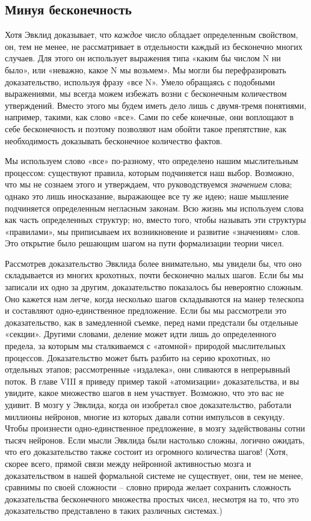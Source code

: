 \documentclass[../main.tex]{subfiles}
\begin{document}
\subsection{Минуя бесконечность}

Хотя Эвклид доказывает, что \emph{каждое} число обладает определенным свойством, он, тем не менее, не рассматривает в отдельности каждый из бесконечно многих случаев. Для этого он использует выражения типа «каким бы числом N ни было», или «неважно, какое N мы возьмем». Мы могли бы перефразировать доказательство, используя фразу «все N». Умело обращаясь с подобными выражениями, мы всегда можем избежать возни с бесконечным количеством утверждений. Вместо этого мы будем иметь дело лишь с двумя-тремя понятиями, например, такими, как слово «все». Сами по себе конечные, они воплощают в себе бесконечность и поэтому позволяют нам обойти такое препятствие, как необходимость доказывать бесконечное количество фактов.

Мы используем слово «все» по-разному, что определено нашим мыслительным процессом: существуют правила, которым подчиняется наш выбор. Возможно, что мы не сознаем этого и утверждаем, что руководствуемся \emph{значением} слова; однако это лишь иносказание, выражающее все ту же идею; наше мышление подчиняется определенным негласным законам. Всю жизнь мы используем слова как часть определенных структур; но, вместо того, чтобы называть эти структуры «правилами», мы приписываем их возникновение и развитие «значениям» слов. Это открытие было решающим шагом на пути формализации теории чисел.

Рассмотрев доказательство Эвклида более внимательно, мы увидели бы, что оно складывается из многих крохотных, почти бесконечно малых шагов. Если бы мы записали их одно за другим, доказательство показалось бы невероятно сложным. Оно кажется нам легче, когда несколько шагов складываются на манер телескопа и составляют одно-единственное предложение. Если бы мы рассмотрели это доказательство, как в замедленной съемке, перед нами предстали бы отдельные «секции». Другими словами, деление может идти лишь до определенного предела, за которым мы сталкиваемся с «атомной» природой мыслительных процессов. Доказательство может быть разбито на серию крохотных, но отдельных этапов; рассмотренные «издалека», они сливаются в непрерывный поток. В главе VIII я приведу пример такой «атомизации» доказательства, и вы увидите, какое множество шагов в нем участвует. Возможно, что это вас не удивит. В мозгу у Эвклида, когда он изобретал свое доказательство, работали миллионы нейронов, многие из которых давали сотни импульсов в секунду. Чтобы произнести одно-единственное предложение, в мозгу задействованы сотни тысяч нейронов. Если мысли Эвклида были настолько сложны, логично ожидать, что его доказательство также состоит из огромного количества шагов! (Хотя, скорее всего, прямой связи между нейронной активностью мозга и доказательством в нашей формальной системе не существует, они, тем не менее, сравнимы по своей сложности \--- словно природа желает сохранить сложность доказательства бесконечного множества простых чисел, несмотря на то, что это доказательство представлено в таких различных системах.)
\end{document}

